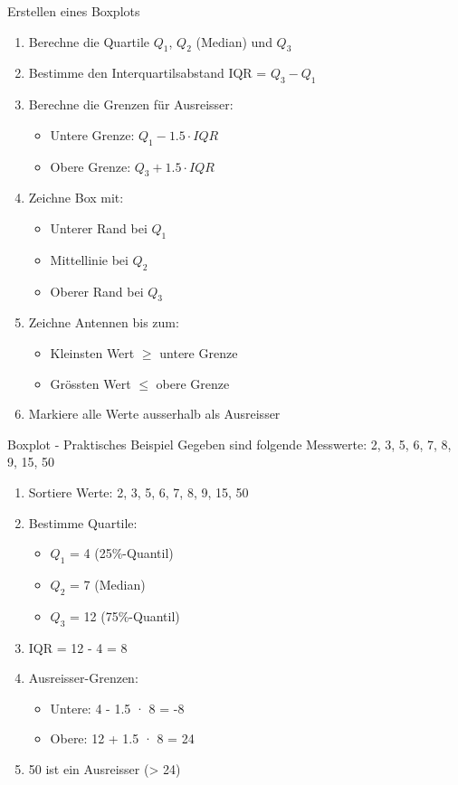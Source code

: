 \begin{KR}{Erstellen eines Boxplots}
\begin{enumerate}
    \item Berechne die Quartile $Q_1$, $Q_2$ (Median) und $Q_3$
    \item Bestimme den Interquartilsabstand IQR = $Q_3 - Q_1$
    \item Berechne die Grenzen für Ausreisser:
        \begin{itemize}
            \item Untere Grenze: $Q_1 - 1.5 \cdot IQR$
            \item Obere Grenze: $Q_3 + 1.5 \cdot IQR$
        \end{itemize}
    \item Zeichne Box mit:
        \begin{itemize}
            \item Unterer Rand bei $Q_1$
            \item Mittellinie bei $Q_2$
            \item Oberer Rand bei $Q_3$
        \end{itemize}
    \item Zeichne Antennen bis zum:
        \begin{itemize}
            \item Kleinsten Wert  $\geqslant$  untere Grenze
            \item Grössten Wert $\leqslant$  obere Grenze
        \end{itemize}
    \item Markiere alle Werte ausserhalb als Ausreisser
\end{enumerate}
\end{KR}

\begin{example2}{Boxplot - Praktisches Beispiel}
Gegeben sind folgende Messwerte: 2, 3, 5, 6, 7, 8, 9, 15, 50
\begin{enumerate}
    \item Sortiere Werte: 2, 3, 5, 6, 7, 8, 9, 15, 50
    \item Bestimme Quartile:
        \begin{itemize}
            \item $Q_1$ = 4 (25\%-Quantil)
            \item $Q_2$ = 7 (Median)
            \item $Q_3$ = 12 (75\%-Quantil)
        \end{itemize}
    \item IQR = 12 - 4 = 8
    \item Ausreisser-Grenzen:
        \begin{itemize}
            \item Untere: 4 - 1.5 · 8 = -8
            \item Obere: 12 + 1.5 · 8 = 24
        \end{itemize}
    \item 50 ist ein Ausreisser (> 24)
\end{enumerate}
\end{example2}

